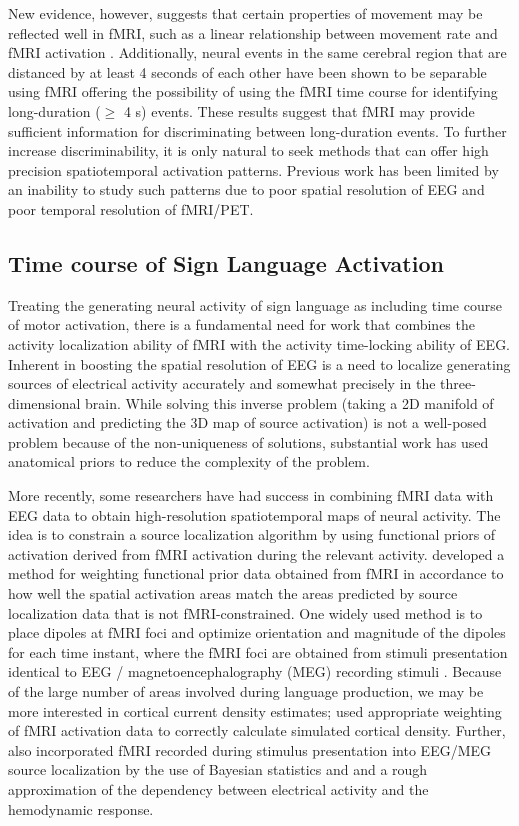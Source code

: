\documentclass{proposal}
\begin{document}
New evidence, however, suggests that certain properties of movement may be reflected well in fMRI, such as a linear relationship between movement rate and fMRI activation \cite[]{rao1996rbf}. Additionally, neural events in the same cerebral region that are distanced by at least 4 seconds of each other have been shown to be separable using fMRI \cite[]{kim1997ltr} offering the possibility of using the fMRI time course for identifying long-duration ($\geq$ 4 s) events. These results suggest that fMRI may provide sufficient information for discriminating between long-duration events. To further increase discriminability, it is only natural to seek methods that can offer high precision spatiotemporal activation patterns. Previous work has been limited by an inability to study such patterns due to poor spatial resolution of EEG and poor temporal resolution of fMRI/PET.

\subsection{Time course of Sign Language Activation}

Treating the generating neural activity of sign language as including time course of motor activation, there is a fundamental need for work that combines the activity localization ability of fMRI with the activity time-locking ability of EEG. Inherent in boosting the spatial resolution of EEG is a need to localize generating sources of electrical activity accurately and somewhat precisely in the three-dimensional brain. While solving this inverse problem (taking a 2D manifold of activation and predicting the 3D map of source activation) is not a well-posed problem because of the non-uniqueness of solutions, substantial work has used anatomical priors to reduce the complexity of the problem.

More recently, some researchers have had success in combining fMRI data with EEG data to obtain high-resolution spatiotemporal maps of neural activity. The idea is to constrain a source localization algorithm by using functional priors of activation derived from fMRI activation during the relevant activity. \cite{im2006tcm} developed a method for weighting functional prior data obtained from fMRI in accordance to how well the spatial activation areas match the areas predicted by source localization data that is not fMRI-constrained. One widely used method is to place dipoles at fMRI foci and optimize orientation and magnitude of the dipoles for each time instant, where the fMRI foci are obtained from stimuli presentation identical to EEG / magnetoencephalography (MEG) recording stimuli \cite[]{ahlfors1999sac}. Because of the large number of areas involved during language production, we may be more interested in cortical current density estimates; \cite{wagner2000fcd} used appropriate weighting of fMRI activation data to correctly calculate simulated cortical density. Further, \cite{dale2000dsp} also incorporated fMRI recorded during stimulus presentation into EEG/MEG source localization by the use of Bayesian statistics and and a rough approximation of the dependency between electrical activity and the hemodynamic response.
\end{document}
